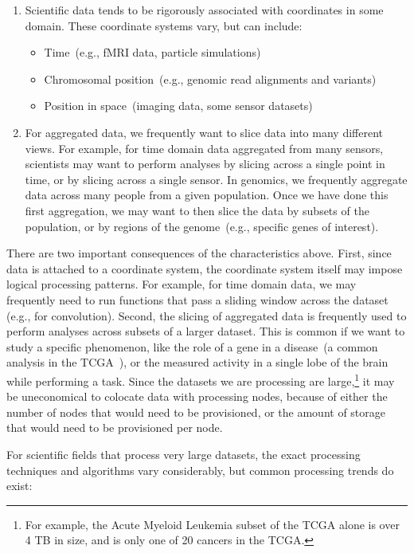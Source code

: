 \documentclass[10pt]{report} %
\begin{document}
\begin{enumerate}
\item Scientific data tends to be rigorously associated with coordinates in some domain. These coordinate
systems vary, but can include:
\begin{itemize}
\item Time~(e.g., fMRI data, particle simulations)
\item Chromosomal position~(e.g., genomic read alignments and variants)
\item Position in space~(imaging data, some sensor datasets)
\end{itemize}
\item For aggregated data, we frequently want to slice data into many different views. For example, for time
domain data aggregated from many sensors, scientists may want to perform analyses by slicing
across a single point in time, or by slicing across a single sensor. In genomics, we frequently aggregate data
across many people from a given population. Once we have done this first aggregation, we may want to then
slice the data by subsets of the population, or by regions of the genome~(e.g., specific genes of interest).
\end{enumerate}

There are two important consequences of the characteristics above. First, since data is attached to a
coordinate system, the coordinate system itself may impose logical processing patterns. For example, for
time domain data, we may frequently need to run functions that pass a sliding window across the dataset (e.g., for
convolution). Second, the slicing of aggregated data is frequently used to perform analyses across
subsets of a larger dataset. This is common if we want to study a specific phenomenon, like the role of a
gene in a disease~(a common analysis in the TCGA~\cite{weinstein13}), or the measured activity in a
single lobe of the brain while performing a task. Since the datasets we are processing are
large,\footnote{For example, the Acute Myeloid Leukemia subset of the TCGA alone is over 4 TB in size, and
is only one of 20 cancers in the TCGA.} it may be uneconomical to colocate data with processing nodes,
because of either the number of nodes that would need to be provisioned, or the amount of storage that would
need to be provisioned per node.

For scientific fields that process very large datasets, the exact processing techniques and algorithms vary
considerably, but common processing trends do exist:
\end{document}
